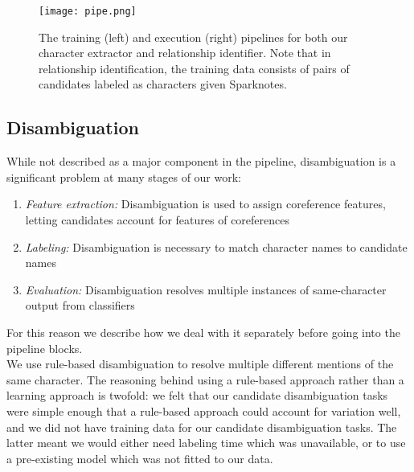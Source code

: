 \documentclass[12pt]{article}
\begin{document}
\begin{figure}[H]
    \centering
    \texttt{[image: pipe.png]}
    \caption{The training (left) and execution (right) pipelines for both our character extractor and relationship identifier.
        Note that in relationship identification, the training data consists of pairs of candidates labeled as
    characters given Sparknotes.}
\end{figure}

    \subsection{Disambiguation}
        While not described as a major component in the pipeline, disambiguation is a significant problem 
        at many stages of our work:
        \begin{enumerate}
            \setlength\itemsep{0em}
            \item \emph{Feature extraction:} Disambiguation is used to assign coreference features, letting candidates account for features of coreferences 
            \item \emph{Labeling:} Disambiguation is necessary to match character names to candidate names 
            \item \emph{Evaluation:} Disambiguation resolves multiple instances of same-character output from classifiers
        \end{enumerate}
        
        For this reason we describe how we deal with it separately before going into the pipeline blocks. \\

        We use rule-based disambiguation to resolve multiple different mentions of the same character.  
        The reasoning behind using a rule-based approach rather than a learning approach is
        twofold: we felt that our candidate disambiguation tasks were simple enough that a rule-based approach 
        could account for variation well, and we did not have training data for our candidate
        disambiguation tasks. The latter meant we would either need labeling time which was unavailable, or
        to use a pre-existing model which was not fitted to our data. \\
\end{document}
